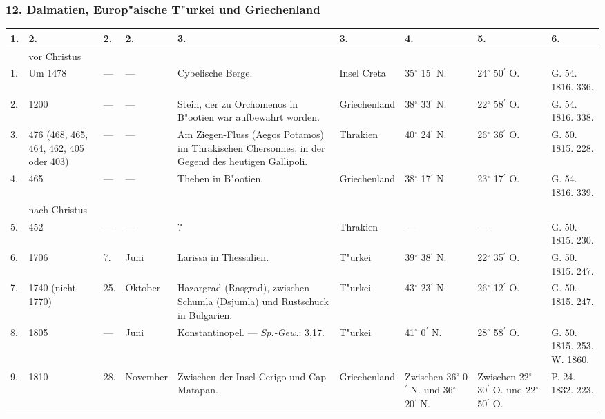 \documentclass[a4paper, 8pt, oneside, polutonikogreek, german]{article}
\begin{document}
\subsubsection{12. Dalmatien, Europ"aische T"urkei und Griechenland}
\begin{center}
    \footnotesize
    \begin{longtable}{|p{3mm}|p{12mm}|p{5mm}|p{13mm}|p{25mm}|p{15mm}|p{10mm}|p{10mm}|p{11mm}|}
    \hline
        1. & 2. & 2. & 2. & 3. & 3. & 4. & 5. & 6. \\ \hline
          & vor Christus &   &   &   &   &   &   &   \\ \hline
        1. & Um 1478 & --- & --- & Cybelische Berge. & Insel Creta & 35$^\circ$ 15$^\prime$ N. & 24$^\circ$ 50$^\prime$ O. & G. 54. 1816. 336. \\ \hline
        2. & 1200 & --- & --- & Stein, der zu Orchomenos in B"ootien war aufbewahrt worden. & Griechenland & 38$^\circ$ 33$^\prime$ N. & 22$^\circ$ 58$^\prime$ O. & G. 54. 1816. 338. \\ \hline
        3. & 476 (468, 465, 464, 462, 405 oder 403) & --- & --- & Am Ziegen-Fluss (Aegos Potamos) im Thrakischen Chersonnes, in der Gegend des heutigen Gallipoli. & Thrakien & 40$^\circ$ 24$^\prime$ N. & 26$^\circ$ 36$^\prime$ O. & G. 50. 1815. 228. \\ \hline
        4. & 465 & --- & --- & Theben in B"ootien. & Griechenland & 38$^\circ$ 17$^\prime$ N. & 23$^\circ$ 17$^\prime$ O. & G. 54. 1816. 339. \\ \hline
          & nach Christus &   &   &   &   &   &   &   \\ \hline
        5. & 452 & --- & --- & ? & Thrakien & --- & --- & G. 50. 1815. 230. \\ \hline
        6. & 1706 & 7. & Juni & Larissa in Thessalien. & T"urkei & 39$^\circ$ 38$^\prime$ N. & 22$^\circ$ 35$^\prime$ O. & G. 50. 1815. 247. \\ \hline
        7. & 1740 (nicht 1770) & 25. & Oktober & Hazargrad (Rasgrad), zwischen Schumla (Dsjumla) und Rustschuck in Bulgarien. & T"urkei & 43$^\circ$ 23$^\prime$ N. & 26$^\circ$ 12$^\prime$ O. & G. 50. 1815. 247. \\ \hline
        8. & 1805 & --- & Juni & Konstantinopel. --- \emph{Sp.-Gew.}: 3,17. & T"urkei & 41$^\circ$ 0$^\prime$ N. & 28$^\circ$ 58$^\prime$ O. & G. 50. 1815. 253. W. 1860. \\ \hline
        9. & 1810 & 28. & November & Zwischen der Insel Cerigo und Cap Matapan. & Griechenland & Zwischen 36$^\circ$ 0$^\prime$ N. und 36$^\circ$ 20$^\prime$ N. & Zwischen 22$^\circ$ 30$^\prime$ O. und 22$^\circ$ 50$^\prime$ O. & P. 24. 1832. 223. \\ \hline

\end{longtable}
\end{center}
\end{document}
